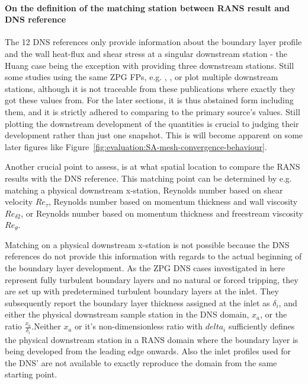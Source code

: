 \paragraph*{On the definition of the matching station between RANS result and DNS reference}

The 12 DNS references only provide information about the boundary layer profile and the wall heat-flux and shear stress at a singular downstream station - the Huang case being the exception with providing three downstream stations. Still some studies using the same ZPG FPs, e.g. \cite{huang2019assessment}, \cite{xue2024assessment}, or \cite{aiken2022assessment} plot multiple downstream stations, although it is not traceable from these publications where exactly they got these values from. For the later sections, it is thus abstained form including them, and it is strictly adhered to comparing to the primary source's values. Still plotting the downstream development of the quantities is crucial to judging their development rather than just one snapshot. This is will become apparent on some later figures like Figure~\ref{fig:evaluation:SA-mesh-convergence-behaviour}.
\par\medskip

Another crucial point to assess, is at what spatial location to compare the RANS results with the DNS reference. This matching point can be determined by e.g. matching a physical downstream x-station, Reynolds number based on shear velocity \(Re_\tau\), Reynolds number based on momentum thickness and wall viscosity \(Re_{\delta2}\), or Reynolds number based on momentum thickness and freestream viscosity \(Re_\theta\).
\par\medskip

Matching on a physical downstream x-station is not possible because the DNS references do not provide this information with regards to the actual beginning of the boundary layer development. As the ZPG DNS cases investigated in here represent fully turbulent boundary layers and no natural or forced tripping, they are set up with predetermined turbulent boundary layers at the inlet. They subsequently report the boundary layer thickness assigned at the inlet as \(\delta_i\), and either the physical downstream sample station in the DNS domain, \(x_a\), or the ratio \(\frac{x_a}{\delta_i}\).Neither \(x_a\) or it's non-dimensionless ratio with \(delta_i\) sufficiently defines the physical downstream station in a RANS domain where the boundary layer is being developed from the leading edge onwards. Also the inlet profiles used for the DNS' are not available to exactly reproduce the domain from the same starting point.
\par\medskip

